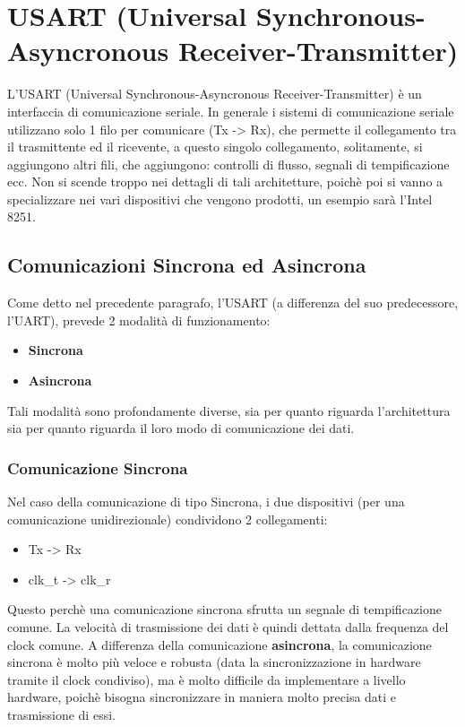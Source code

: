 \newpage
\section{USART (Universal Synchronous-Asyncronous Receiver-Transmitter)}

L'USART (Universal Synchronous-Asyncronous Receiver-Transmitter) è un interfaccia di comunicazione seriale. In generale i sistemi di comunicazione seriale utilizzano solo 1 filo per comunicare (Tx -> Rx), che permette il collegamento tra il trasmittente ed il ricevente, a questo singolo collegamento, solitamente, si aggiungono altri fili, che aggiungono: controlli di flusso, segnali di tempificazione ecc.
Non si scende troppo nei dettagli di tali architetture, poichè poi si vanno a specializzare nei vari dispositivi che vengono prodotti, un esempio sarà l'Intel 8251.

\subsection{Comunicazioni Sincrona ed Asincrona}
Come detto nel precedente paragrafo, l'USART (a differenza del suo predecessore, l'UART), prevede 2 modalità di funzionamento:
\begin{itemize}
    \item \textbf{Sincrona}
    \item \textbf{Asincrona}
\end{itemize}
Tali modalità sono profondamente diverse, sia per quanto riguarda l'architettura sia per quanto riguarda il loro modo di comunicazione dei dati.

\subsubsection{Comunicazione Sincrona}
Nel caso della comunicazione di tipo Sincrona, i due dispositivi (per una comunicazione unidirezionale) condividono 2 collegamenti:
\begin{itemize}
    \item Tx -> Rx
    \item clk\_t -> clk\_r
\end{itemize}

Questo perchè una comunicazione sincrona sfrutta un segnale di tempificazione comune. La velocità di trasmissione dei dati è quindi dettata dalla frequenza del clock comune. A differenza della comunicazione \textbf{asincrona}, la comunicazione sincrona è molto più veloce e robusta (data la sincronizzazione in hardware tramite il clock condiviso), ma è molto difficile da implementare a livello hardware, poichè bisogna sincronizzare in maniera molto precisa dati e trasmissione di essi.

